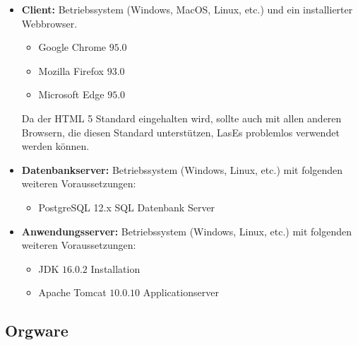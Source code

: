 \begin{itemize}

	\item \textbf{Client:} Betriebssystem (Windows, MacOS, Linux, etc.) und ein installierter Webbrowser.

	\begin{itemize}
		\item Google Chrome $95.0$
		\item Mozilla Firefox $93.0$
		\item Microsoft Edge $95.0$
	\end{itemize}

	Da der HTML 5 Standard eingehalten wird, sollte auch mit allen anderen Browsern, die diesen Standard unterstützen, LasEs problemlos verwendet werden können.

	\item \textbf{Datenbankserver:} Betriebssystem (Windows, Linux, etc.) mit folgenden weiteren Voraussetzungen:

	\begin{itemize}
		\item PostgreSQL 12.x SQL Datenbank Server
	\end{itemize}

	\item \textbf{Anwendungsserver:} Betriebssystem (Windows, Linux, etc.) mit folgenden weiteren Voraussetzungen:

	\begin{itemize}
		\item JDK $16.0.2$ Installation
		\item Apache Tomcat $10.0.10$ Applicationserver
	\end{itemize}

\end{itemize}

\subsection{Orgware}


